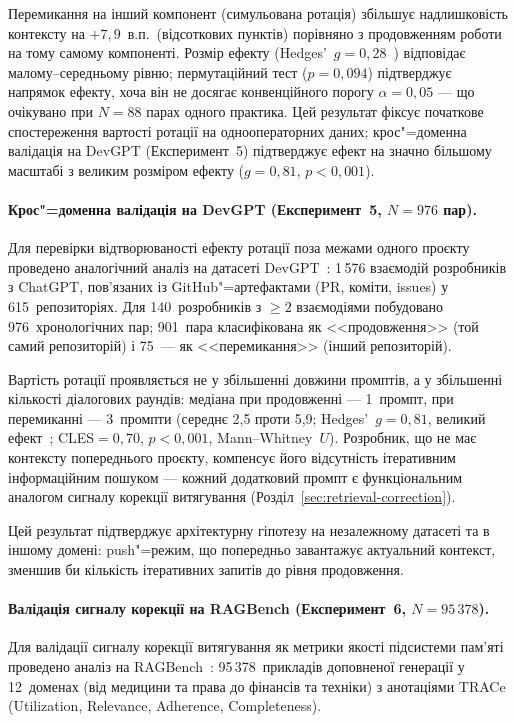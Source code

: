 \documentclass[11pt]{article}
\begin{document}
Перемикання на інший компонент (симульована ротація) збільшує надлишковість контексту на $+7{,}9$~в.п.\ (відсоткових пунктів) порівняно з продовженням роботи на тому самому компоненті.
Розмір ефекту (Hedges'~$g{=}0{,}28$~\citep{hedges1981distribution}) відповідає малому--середньому рівню; пермутаційний тест ($p{=}0{,}094$) підтверджує напрямок ефекту, хоча він не досягає конвенційного порогу $\alpha{=}0{,}05$ --- що очікувано при $N{=}88$ парах одного практика.
Цей результат фіксує початкове спостереження вартості ротації на однооператорних даних; крос"=доменна валідація на DevGPT (Експеримент~5) підтверджує ефект на значно більшому масштабі з великим розміром ефекту ($g{=}0{,}81$, $p{<}0{,}001$).

\paragraph{Крос"=доменна валідація на DevGPT (Експеримент~5, $N{=}976$ пар).}
Для перевірки відтворюваності ефекту ротації поза межами одного проєкту проведено аналогічний аналіз на датасеті DevGPT~\citep{xiao2024devgpt}: 1\,576 взаємодій розробників з ChatGPT, пов'язаних із GitHub"=артефактами (PR, коміти, issues) у 615~репозиторіях.
Для 140~розробників з ${\geq}2$ взаємодіями побудовано 976~хронологічних пар; 901~пара класифікована як <<продовження>> (той самий репозиторій) і 75~--- як <<перемикання>> (інший репозиторій).

Вартість ротації проявляється не у збільшенні довжини промптів, а у збільшенні кількості діалогових раундів: медіана при продовженні --- 1~промпт, при перемиканні --- 3~промпти (середнє 2{,}5 проти 5{,}9; Hedges'~$g{=}0{,}81$, великий ефект~\citep{hedges1981distribution}; CLES${=}0{,}70$, $p{<}0{,}001$, Mann--Whitney~$U$).
Розробник, що не має контексту попереднього проєкту, компенсує його відсутність ітеративним інформаційним пошуком --- кожний додатковий промпт є функціональним аналогом сигналу корекції витягування (Розділ~\ref{sec:retrieval-correction}).

Цей результат підтверджує архітектурну гіпотезу на незалежному датасеті та в іншому домені: push"=режим, що попередньо завантажує актуальний контекст, зменшив би кількість ітеративних запитів до рівня продовження.

\paragraph{Валідація сигналу корекції на RAGBench (Експеримент~6, $N{=}95\,378$).}
Для валідації сигналу корекції витягування як метрики якості підсистеми пам'яті проведено аналіз на RAGBench~\citep{friel2024ragbench}: 95\,378~прикладів доповненої генерації у 12~доменах (від медицини та права до фінансів та техніки) з анотаціями TRACe (Utilization, Relevance, Adherence, Completeness).
\end{document}
